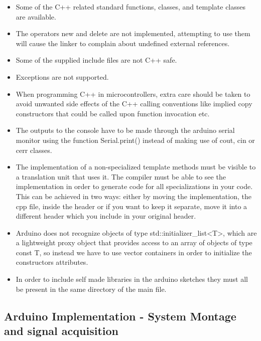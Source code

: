 \begin{refsection}
	\begin{itemize}
		\item Some of the C++ related standard functions, classes, and template classes are available.
		\item The operators new and delete are not implemented, attempting to use them will cause the linker to complain about undefined external references.
		\item Some of the supplied include files are not C++ safe.
		\item Exceptions are not supported.
		\item When programming C++ in microcontrollers, extra care should be taken to avoid unwanted side effects of the C++ calling conventions like implied copy constructors that could be called upon function invocation etc.
		\item The outputs to the console have to be made through the arduino serial monitor using the function Serial.print() instead of making use of cout, cin or cerr classes.
		\item  The implementation of a non-specialized template methods must be visible to a translation unit that uses it. The compiler must be able to see the implementation in order to generate code for all specializations in your code. This can be achieved in two ways: either by moving the implementation, the cpp file, inside the header or if you want to keep it separate, move it into a different header which you include in your original header.
		\item Arduino does not recognize objects of type std::initializer\_list<T>, which are a lightweight proxy object that provides access to an array of objects of type const T, so instead we have to use vector containers in order to initialize the constructors attributes.
		\item In order to include self made libraries in the arduino sketches they must all be present in the same directory of the main file.
		
	\end{itemize}
	
	
	\subsection{Arduino Implementation - System Montage and signal acquisition}
	

\end{refsection}
